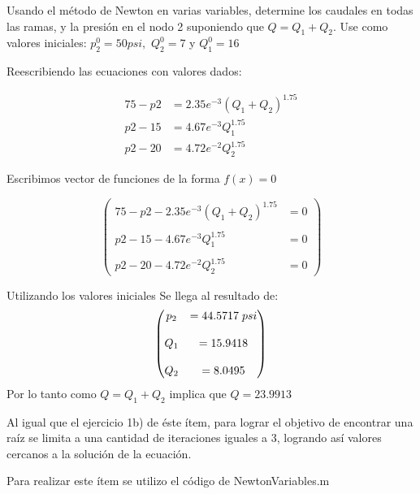 \documentclass{udpreport}
\begin{document}
\begin{enumerate}
    Usando el método de Newton en varias variables, determine los caudales en todas las ramas, y la presión en el nodo 2 suponiendo que $Q = Q_1 + Q_2 $. Use como valores iniciales: $ p_2^0= 50 psi,$  $Q_2^0=7$ y  $Q_1^0=16$
    
    
    Reescribiendo las ecuaciones con valores dados:
    
    \begin{align*} 
        75 - p2 &=  2.35e^{-3}(Q_1+Q_2)^{1.75} \\ 
        p2 - 15 &= 4.67e^{-3}Q_1^{1.75} \\
        p2 - 20 &= 4.72e^{-2}Q_2^{1.75}
    \end{align*}
    
    Escribimos vector de funciones de la forma $f(x) = 0$

   $$\begin{pmatrix}
        75 - p2 - 2.35e^{-3}(Q_1+Q_2)^{1.75} &= 0 \\
        \\
        p2 - 15 - 4.67e^{-3}Q_1^{1.75} &= 0  \\
        \\
        p2 - 20 - 4.72e^{-2}Q_2^{1.75} &= 0
    \end{pmatrix}$$
    
    Utilizando los valores iniciales Se llega al resultado de: 
    $$\begin{pmatrix}
        p_2 &=44.5717 \hspace{0.1cm} psi \\
        \\
        Q_1 &=15.9418 \\
        \\
        Q_2 &=8.0495
    \end{pmatrix}$$
    Por lo tanto como $Q = Q_1 + Q_2 $ implica que $ Q = 23.9913 $
    
    Al igual que el ejercicio 1b) de éste ítem, para lograr el objetivo de encontrar una raíz se limita a una cantidad de iteraciones iguales a 3, logrando así valores cercanos a la solución de la ecuación.
    
    Para realizar este ítem se utilizo el código de NewtonVariables.m
    \end{enumerate}
    \newpage

    
\end{document}
